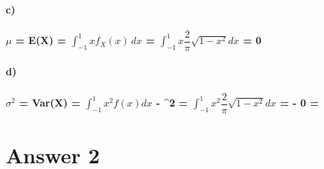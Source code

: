 \documentclass[12pt]{article}
\begin{document}
\paragraph{c)
\\\\{\hspace*{50}}${\mu}$ = E(X) = \(\int_{-1}^{1} x f_{X}(x) \,dx \) = \(\int_{-1}^{1} x \dfrac{2}{\pi}\sqrt{1-x^2} dx \) = 0
}
\paragraph{d)
\\\\ {\hspace*{50}}${\sigma^2}$ = Var(X) = \(\int_{-1}^{1} x^2f(x) dx\) - \mu^2 = \(\int_{-1}^{1} x^2 \dfrac{2}{\pi}\sqrt{1-x^2} dx \) =  - 0 = 
}
\newpage
\section*{Answer 2}
\end{document}
